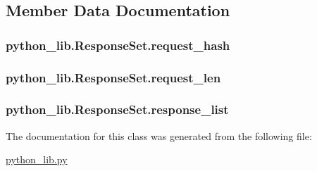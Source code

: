 \subsection{Member Data Documentation}
\hypertarget{classpython__lib_1_1_response_set_a8a94812ec58f4aeb8d25e7db276ffd18}{
\subsubsection[{request\-\_\-hash}]{\setlength{\rightskip}{0pt plus 5cm}python\-\_\-lib.\-Response\-Set.\-request\-\_\-hash}}\label{classpython__lib_1_1_response_set_a8a94812ec58f4aeb8d25e7db276ffd18}
\hypertarget{classpython__lib_1_1_response_set_a367476495a8153449e57c0bd7e03057f}{
\subsubsection[{request\-\_\-len}]{\setlength{\rightskip}{0pt plus 5cm}python\-\_\-lib.\-Response\-Set.\-request\-\_\-len}}\label{classpython__lib_1_1_response_set_a367476495a8153449e57c0bd7e03057f}
\hypertarget{classpython__lib_1_1_response_set_add79790ff3d888c6660a05f97ca39f7d}{
\subsubsection[{response\-\_\-list}]{\setlength{\rightskip}{0pt plus 5cm}python\-\_\-lib.\-Response\-Set.\-response\-\_\-list}}\label{classpython__lib_1_1_response_set_add79790ff3d888c6660a05f97ca39f7d}


The documentation for this class was generated from the following file\-:\begin{DoxyCompactItemize}
\item 
\hyperlink{python__lib_8py}{python\-\_\-lib.\-py}\end{DoxyCompactItemize}
